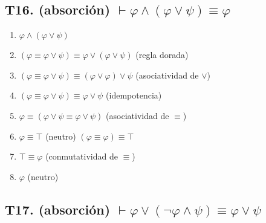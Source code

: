 \subsection{T16. (absorción) $\vdash \varphi \land (\varphi \lor \psi) \equiv \varphi $}

\begin{enumerate}
    \item $\varphi \land (\varphi \lor \psi)$
    \item $(\varphi \equiv \varphi \lor \psi) \equiv \varphi \lor (\varphi \lor \psi)$ \hfill (regla dorada)
    \item $(\varphi \equiv \varphi \lor \psi) \equiv (\varphi \lor \varphi) \lor \psi$ \hfill (asociatividad de $\lor$)
    \item $(\varphi \equiv \varphi \lor \psi) \equiv \varphi \lor \psi$ \hfill (idempotencia)
    \item $\varphi \equiv (\varphi \lor \psi \equiv \varphi \lor \psi)$ \hfill (asociatividad de $\equiv$)
    \item $\varphi \equiv \top$ \hfill (neutro) $(\varphi \equiv \varphi) \equiv \top$
    \item $\top \equiv \varphi$ \hfill (conmutatividad de $\equiv$)
    \item $\varphi$ \hfill (neutro)
\end{enumerate}

\subsection{T17. (absorción) $\vdash \varphi \lor (\neg\varphi \land \psi) \equiv \varphi \lor \psi $}

